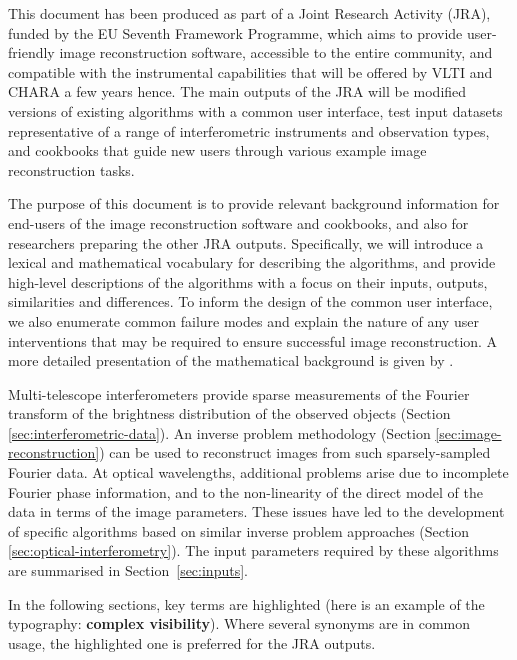 \documentclass{article}
\newcommand{\vocab}[1]{\textbf{#1}}
\begin{document}
This document has been produced as part of a Joint Research Activity (JRA),
funded by the EU Seventh Framework Programme, which aims to provide
user-friendly image reconstruction software, accessible to the entire
community, and compatible with the instrumental capabilities that will be
offered by VLTI and CHARA a few years hence. The main outputs of the JRA will
be modified versions of existing algorithms with a common user interface, test
input datasets representative of a range of interferometric instruments and
observation types, and cookbooks that guide new users through various example
image reconstruction tasks.

The purpose of this document is to provide relevant background information for
end-users of the image reconstruction software and cookbooks, and also for
researchers preparing the other JRA outputs. Specifically, we will introduce a
lexical and mathematical vocabulary for describing the algorithms, and provide
high-level descriptions of the algorithms with a focus on their inputs,
outputs, similarities and differences. To inform the design of the common user
interface, we also enumerate common failure modes and explain the nature of
any user interventions that may be required to ensure successful image
reconstruction.  A more detailed presentation of the mathematical background
is given by \citet{Thiebaut-2013-principles}.

Multi-telescope interferometers provide sparse measurements of the Fourier
transform of the brightness distribution of the observed objects (Section
\ref{sec:interferometric-data}). An inverse problem methodology (Section
\ref{sec:image-reconstruction}) can be used to reconstruct images from such
sparsely-sampled Fourier data.  At optical wavelengths, additional problems
arise due to incomplete Fourier phase information, and to the non-linearity of
the direct model of the data in terms of the image parameters.  These issues
have led to the development of specific algorithms based on similar inverse
problem approaches (Section \ref{sec:optical-interferometry}). The input
parameters required by these algorithms are summarised in
Section~\ref{sec:inputs}.

In the following sections, key terms are highlighted (here is an example of
the typography: \vocab{complex visibility}). Where several synonyms are in
common usage, the highlighted one is preferred for the JRA outputs.


\end{document}
